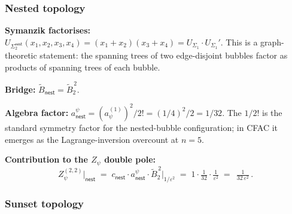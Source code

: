 \documentclass[11pt,a4paper]{article}
\theoremstyle{definition}
\theoremstyle{plain}
\begin{document}
\subsubsection{Nested topology}

\begin{cfacbox}
\begin{center}
\end{center}
\textbf{Symanzik factorises:}
$U_{\Sigma_2^{\textsf{nest}}}(x_1,x_2,x_3,x_4) = (x_1 + x_2)(x_3 + x_4)
 = U_{\Sigma_1}\!\cdot U_{\Sigma_1}'$.
This is a graph-theoretic statement: the spanning trees of two
edge-disjoint bubbles factor as products of spanning trees of each
bubble.

\textbf{Bridge:} $\tilde B_{\textsf{nest}} = \tilde B_2^{\,2}$.

\textbf{Algebra factor:} $a^\psi_{\textsf{nest}} = (a_\psi^{(1)})^2 / 2!
= (1/4)^2 / 2 = 1/32$.  The $1/2!$ is the standard symmetry factor
for the nested-bubble configuration; in CFAC it emerges as the
Lagrange-inversion overcount at $n = 5$.

\textbf{Contribution to the $Z_\psi$ double pole:}
\begin{equation}
  Z_\psi^{(2,2)}\big|_{\textsf{nest}}
  \;=\; c_{\textsf{nest}}\!\cdot a^\psi_{\textsf{nest}}\cdot
        \tilde B_2^{\,2}\big|_{1/\varepsilon^2}
  \;=\; 1 \cdot \tfrac{1}{32} \cdot \tfrac{1}{\varepsilon^2}
  \;=\; \boxed{\,\tfrac{1}{32\,\varepsilon^2}\,}.
\end{equation}
\end{cfacbox}

\subsubsection{Sunset topology}
\end{document}
